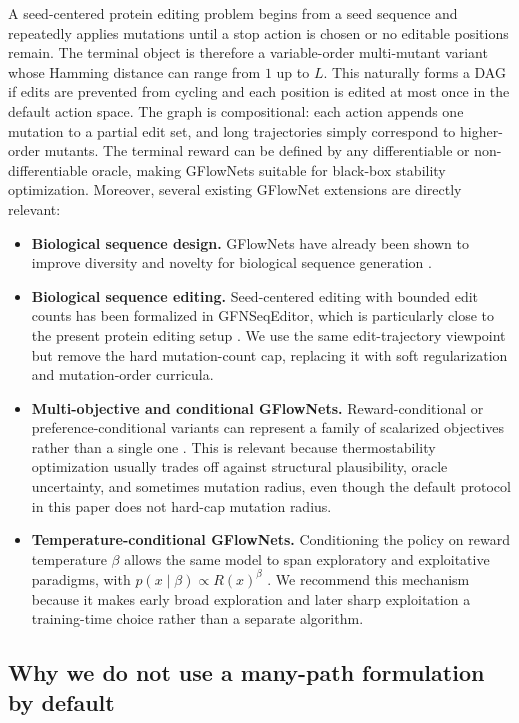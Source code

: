 \documentclass[11pt]{article}
\begin{document}
	A seed-centered protein editing problem begins from a seed sequence and repeatedly applies mutations until a stop action is chosen or no editable positions remain. The terminal object is therefore a variable-order multi-mutant variant whose Hamming distance can range from $1$ up to $L$. This naturally forms a DAG if edits are prevented from cycling and each position is edited at most once in the default action space. The graph is compositional: each action appends one mutation to a partial edit set, and long trajectories simply correspond to higher-order mutants. The terminal reward can be defined by any differentiable or non-differentiable oracle, making GFlowNets suitable for black-box stability optimization. Moreover, several existing GFlowNet extensions are directly relevant:
	\begin{itemize}[leftmargin=1.5em]
		\item \textbf{Biological sequence design.} GFlowNets have already been shown to improve diversity and novelty for biological sequence generation \citep{jain2022bioseqgfn}.
		\item \textbf{Biological sequence editing.} Seed-centered editing with bounded edit counts has been formalized in GFNSeqEditor, which is particularly close to the present protein editing setup \citep{ghari2024gfnseqeditor}. We use the same edit-trajectory viewpoint but remove the hard mutation-count cap, replacing it with soft regularization and mutation-order curricula.
		\item \textbf{Multi-objective and conditional GFlowNets.} Reward-conditional or preference-conditional variants can represent a family of scalarized objectives rather than a single one \citep{jain2023mogfn,zhu2023hn-gfn}. This is relevant because thermostability optimization usually trades off against structural plausibility, oracle uncertainty, and sometimes mutation radius, even though the default protocol in this paper does not hard-cap mutation radius.
		\item \textbf{Temperature-conditional GFlowNets.} Conditioning the policy on reward temperature $\beta$ allows the same model to span exploratory and exploitative paradigms, with $p(x\mid\beta)\propto R(x)^\beta$ \citep{kim2023lsl-gfn}. We recommend this mechanism because it makes early broad exploration and later sharp exploitation a training-time choice rather than a separate algorithm.
	\end{itemize}
	
	\subsection{Why we do not use a many-path formulation by default}
	
\end{document}
